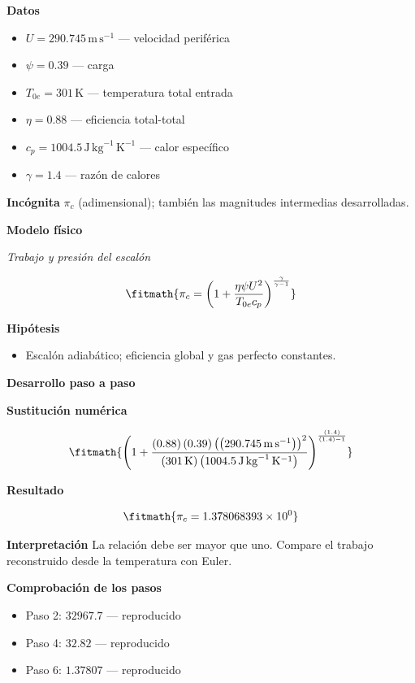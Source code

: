 \documentclass[10pt,openany]{book}
\begin{document}
\noindent\textbf{Datos}
\begin{itemize}
\item $U = 290.745\,\mathrm{m}\,\mathrm{s}^{-1}$ — velocidad periférica
\item $\psi = 0.39$ — carga
\item $T_{0e} = 301\,\mathrm{K}$ — temperatura total entrada
\item $\eta = 0.88$ — eficiencia total-total
\item $c_p = 1004.5\,\mathrm{J}\,\mathrm{kg}^{-1}\,\mathrm{K}^{-1}$ — calor específico
\item $\gamma = 1.4$ — razón de calores
\end{itemize}

\noindent\textbf{Incógnita}
$\pi_c$ (adimensional); también las magnitudes intermedias desarrolladas.

\noindent\textbf{Modelo físico}

\noindent\textit{Trabajo y presión del escalón}

\[
\fitmath{\pi_c=\left(1 + \frac{\eta \psi U^{2}}{T_{0e} c_p}\right)^{\frac{\gamma}{\gamma - 1}}}
\]

\noindent\textbf{Hipótesis}
\begin{itemize}
\item Escalón adiabático; eficiencia global y gas perfecto constantes.
\end{itemize}

\noindent\textbf{Desarrollo paso a paso}



\noindent\textbf{Sustitución numérica}

\[
\fitmath{\left(1 + \frac{\left(0.88\right) \left(0.39\right) \left(\left(290.745\,\mathrm{m}\,\mathrm{s}^{-1}\right)\right)^{2}}{\left(301\,\mathrm{K}\right) \left(1004.5\,\mathrm{J}\,\mathrm{kg}^{-1}\,\mathrm{K}^{-1}\right)}\right)^{\frac{\left(1.4\right)}{\left(1.4\right) - 1}}}
\]

\noindent\textbf{Resultado}

\[
\fitmath{\pi_c=1.378068393\times10^{0}}
\]

\noindent\textbf{Interpretación}
La relación debe ser mayor que uno. Compare el trabajo reconstruido desde la temperatura con Euler.

\noindent\textbf{Comprobación de los pasos}
\begin{itemize}
\item Paso 2: $32967.7$ — reproducido
\item Paso 4: $32.82$ — reproducido
\item Paso 6: $1.37807$ — reproducido
\end{itemize}
\end{document}
